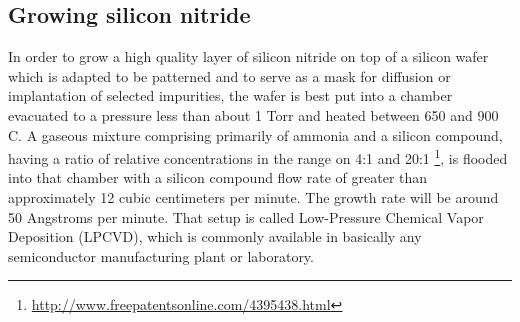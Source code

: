 \subsection{Growing silicon nitride}\label{chemistry_growing_nitride}
In order to grow a high quality layer of silicon nitride on top of a silicon wafer which is adapted to be patterned and to serve as a mask for diffusion or implantation of selected impurities, the wafer is best put into a chamber evacuated to a pressure less than about 1 Torr and heated between 650 and 900 \degree C.
A gaseous mixture comprising primarily of ammonia and a silicon compound, having a ratio of relative concentrations in the range on 4:1 and 20:1 \footnote{\url{http://www.freepatentsonline.com/4395438.html}}, is flooded into that chamber with a silicon compound flow rate of greater than approximately 12 cubic centimeters per minute.
The growth rate will be around 50 Angstroms per minute.
That setup is called Low-Pressure Chemical Vapor Deposition (LPCVD), which is commonly available in basically any semiconductor manufacturing plant or laboratory.
